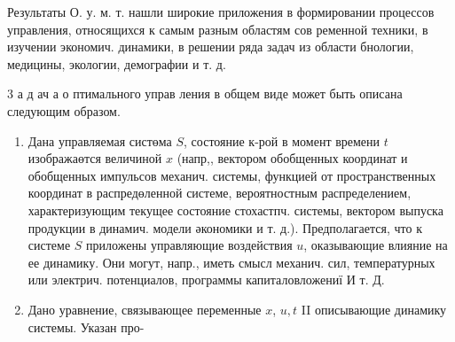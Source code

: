 \documentclass[10pt]{article}
\begin{document}
Результаты О. у. м. т. нашли широкие приложения в формировании процессов управления, относящихся к самым разным областям сов ременной техники, в изучении экономич. динамики, в решении ряда задач из области бнологии, медицины, экологии, демографии и т. д.

3 а д ач а о птимального управ ления в общем виде может быть описана следующим образом.

\begin{enumerate}
  \item Дана управляемая систөма $S$, состояние к-рой в момент времени $t$ изображаөтся величиной $x$ (напр,, вектором обобщенных координат и обобщенных импульсов механич. системы, функцией от пространственных координат в распредөленной системе, вероятностным распределением, характеризующим текущее состояние стохастпч. системы, вектором выпуска продукции в динамич. модели әкономики и т. д.). Предполагается, что к системе $S$ приложены управляющие воздействия $u$, оказывающие влияние на ее динамику. Они могут, напр., иметь смысл механич. сил, температурных или электрич. потенциалов, программы капиталовложениї И т. Д.

  \item Дано уравнение, связывающее переменные $x$, $u, t$ II описывающие динамику системы. Указан про-

\end{enumerate}
\end{document}
